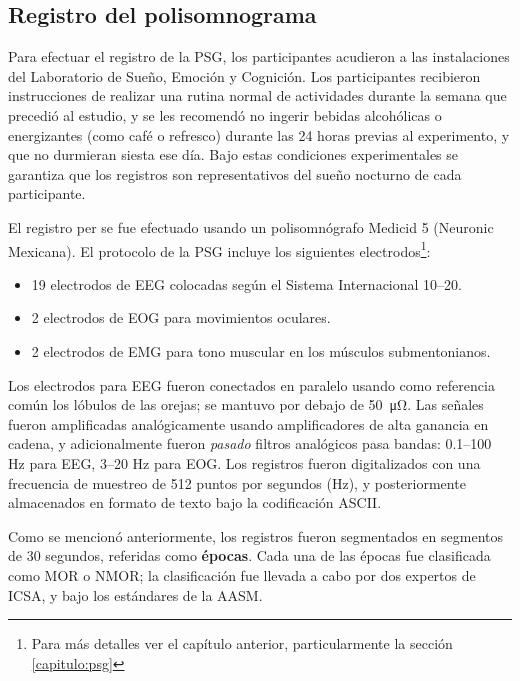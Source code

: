 \subsection{Registro del polisomnograma}

Para efectuar el registro de la PSG, los participantes acudieron a las instalaciones del Laboratorio de Sueño, Emoción y Cognición. 
%
Los participantes recibieron instrucciones de realizar una rutina normal de actividades durante la semana que precedió al estudio, y se les recomendó no ingerir bebidas alcohólicas o energizantes (como café o refresco) durante las 24 horas previas al experimento, y que no durmieran siesta ese día.
%
Bajo estas condiciones experimentales se garantiza que los registros son representativos del sueño nocturno de cada participante.

El registro per se fue efectuado usando un polisomnógrafo Medicid 5 (Neuronic Mexicana). El protocolo de la PSG incluye los siguientes electrodos\footnote{Para más detalles ver el capítulo anterior, particularmente la sección \ref{capitulo:psg}}:
\begin{itemize}
\item 19 electrodos de EEG colocadas según el Sistema Internacional 10--20.
\item 2 electrodos de EOG para movimientos oculares.
\item 2 electrodos de EMG para tono muscular en los músculos submentonianos.
\end{itemize}

Los electrodos para EEG fueron conectados en paralelo usando como referencia común los lóbulos de las orejas; se mantuvo por debajo de \SI{50}{\micro\ohm}.
%
Las señales fueron amplificadas analógicamente usando amplificadores de alta ganancia en cadena, 
y adicionalmente fueron \textit{pasado} filtros analógicos pasa bandas: 0.1--100 Hz 
para EEG, 3--20 Hz para EOG. 
%
Los registros fueron digitalizados con una frecuencia de muestreo de 512 puntos por segundos (Hz), y posteriormente almacenados en formato de texto bajo la codificación ASCII.

Como se mencionó anteriormente, los registros fueron segmentados en segmentos de 30 segundos, referidas como 
\textbf{épocas}.
Cada una de las épocas fue clasificada como MOR o NMOR; la clasificación fue llevada a cabo por dos expertos de ICSA, y bajo los estándares de la AASM.


